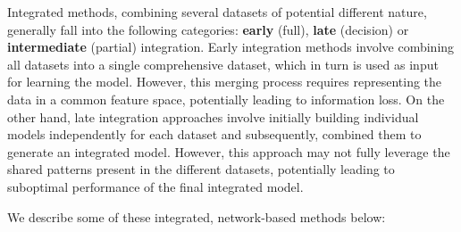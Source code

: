 \documentclass[mainlanguage=english,numlaboratories=2, nofrontcover=true,noaim=false, localbibs, colophon-location=verso-frontcover, oneside, 10pt, localtocs, version=final, nomakeabstract=true]{yathesis}
\begin{document}
Integrated methods, combining several datasets of potential different nature, generally fall into the following categories: \textbf{early} (full), \textbf{late} (decision) or \textbf{intermediate} (partial) integration. Early integration methods involve combining all datasets into a single comprehensive dataset, which in turn is used as input for learning the model. However, this merging process requires representing the data in a common feature space, potentially leading to information loss. On the other hand, late integration approaches involve initially building individual models independently for each dataset and subsequently, combined them to generate an integrated model. However, this approach may not fully leverage the shared patterns present in the different datasets, potentially leading to suboptimal performance of the final integrated model.

We describe some of these integrated, network-based methods below:
\end{document}
